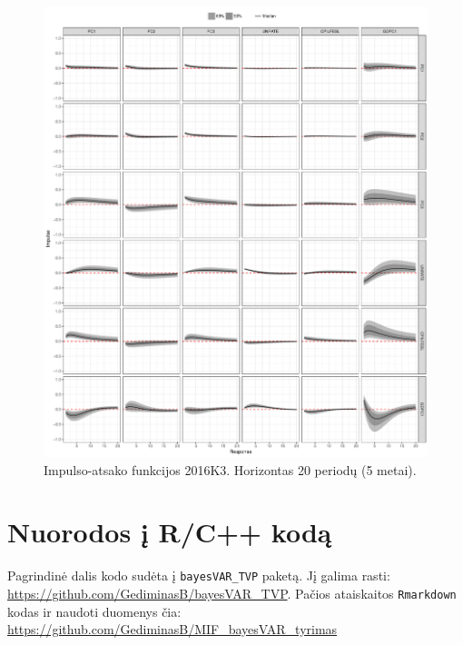 \documentclass[12pt,lithuanian,]{article}
\begin{document}
\begin{figure}[htbp]
\centering
\includegraphics{bayesFAVAR_TVP_files/figure-latex/unnamed-chunk-13-1.pdf}
\caption{\label{fig:impulse-response}Impulso-atsako funkcijos 2016K3.
Horizontas 20 periodų (5 metai).}
\end{figure}

\section{Nuorodos į R/C++ kodą}\label{nuorodos-i-rc-koda}

Pagrindinė dalis kodo sudėta į \texttt{bayesVAR\_TVP} paketą. Jį galima
rasti: \url{https://github.com/GediminasB/bayesVAR_TVP}. Pačios
ataiskaitos \texttt{Rmarkdown} kodas ir naudoti duomenys čia:
\url{https://github.com/GediminasB/MIF_bayesVAR_tyrimas}

\renewcommand\refname{Literatūros sąrašas}

\end{document}
